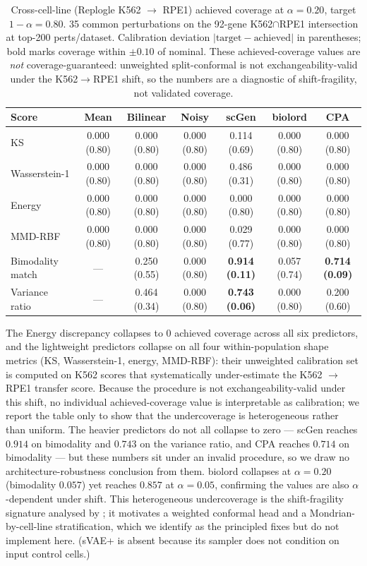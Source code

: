 \documentclass{article}
\begin{document}
\begin{table}[h]
\caption{Cross-cell-line (Replogle K562 $\rightarrow$ RPE1) achieved coverage at $\alpha = 0.20$, target $1 - \alpha = 0.80$. 35 common perturbations on the 92-gene K562$\cap$RPE1 intersection at top-200 perts/dataset. Calibration deviation $|\text{target} - \text{achieved}|$ in parentheses; bold marks coverage within $\pm 0.10$ of nominal. These achieved-coverage values are \emph{not} coverage-guaranteed: unweighted split-conformal is not exchangeability-valid under the K562$\rightarrow$RPE1 shift, so the numbers are a diagnostic of shift-fragility, not validated coverage.}
\label{tab:xcl}
\centering
\small
\setlength{\tabcolsep}{4pt}
\begin{tabular}{lcccccc}
\toprule
Score & Mean & Bilinear & Noisy & scGen & biolord & CPA \\
\midrule
KS                  & 0.000 (0.80) & 0.000 (0.80) & 0.000 (0.80) & 0.114 (0.69) & 0.000 (0.80) & 0.000 (0.80) \\
Wasserstein-1       & 0.000 (0.80) & 0.000 (0.80) & 0.000 (0.80) & 0.486 (0.31) & 0.000 (0.80) & 0.000 (0.80) \\
Energy              & 0.000 (0.80) & 0.000 (0.80) & 0.000 (0.80) & 0.000 (0.80) & 0.000 (0.80) & 0.000 (0.80) \\
MMD-RBF             & 0.000 (0.80) & 0.000 (0.80) & 0.000 (0.80) & 0.029 (0.77) & 0.000 (0.80) & 0.000 (0.80) \\
Bimodality match    & ---          & 0.250 (0.55) & 0.000 (0.80) & \textbf{0.914 (0.11)} & 0.057 (0.74) & \textbf{0.714 (0.09)} \\
Variance ratio      & ---          & 0.464 (0.34) & 0.000 (0.80) & \textbf{0.743 (0.06)} & 0.000 (0.80) & 0.200 (0.60) \\
\bottomrule
\end{tabular}
\end{table}

The Energy discrepancy collapses to $0$ achieved coverage across all six predictors, and the lightweight predictors collapse on all four within-population shape metrics (KS, Wasserstein-1, energy, MMD-RBF): their unweighted calibration set is computed on K562 scores that systematically under-estimate the K562 $\rightarrow$ RPE1 transfer score. Because the procedure is not exchangeability-valid under this shift, no individual achieved-coverage value is interpretable as calibration; we report the table only to show that the undercoverage is heterogeneous rather than uniform. The heavier predictors do not all collapse to zero --- scGen reaches $0.914$ on bimodality and $0.743$ on the variance ratio, and CPA reaches $0.714$ on bimodality --- but these numbers sit under an invalid procedure, so we draw no architecture-robustness conclusion from them. biolord collapses at $\alpha = 0.20$ (bimodality $0.057$) yet reaches $0.857$ at $\alpha = 0.05$, confirming the values are also $\alpha$-dependent under shift. This heterogeneous undercoverage is the shift-fragility signature analysed by \citet{tibshirani2019}; it motivates a weighted conformal head and a Mondrian-by-cell-line stratification, which we identify as the principled fixes but do not implement here. (sVAE+ is absent because its sampler does not condition on input control cells.)
\end{document}
